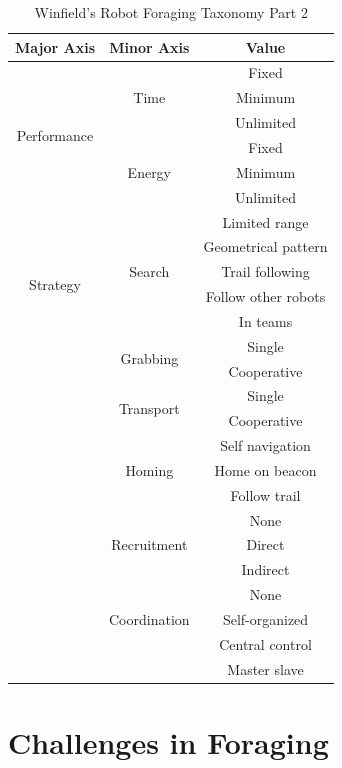 \begin{table}
\centering
    \caption{Winfield's Robot Foraging Taxonomy Part 2}
    \label{foragingtaxonomytable_part2}
    
\begin{tabular}{ | c | c | c |}
\hline
	Major Axis & Minor Axis & Value  \\ \hline
	\multirow{6}{*}{Performance}
		& \multirow{3}{*}{Time} 
			& Fixed \\  
		& 	& Minimum \\ 
		& 	& Unlimited \\ \cline{2-3}
		& \multirow{3}{*}{Energy} 
			& Fixed \\ 
		& 	& Minimum \\ 
		&	& Unlimited \\ \hline
	\multirow{6}{*}{Strategy}	
		& \multirow{5}{*}{Search} 
			& Limited range \\
		&	& Geometrical pattern\\
		&	& Trail following\\
		&	& Follow other robots\\
		&	& In teams\\ \cline{2-3}
		& \multirow{2}{*}{Grabbing} 
			& Single \\
		&	& Cooperative \\ \cline{2-3}
		& \multirow{2}{*}{Transport} 
			& Single \\
		&	& Cooperative \\ \cline{2-3}
		& \multirow{3}{*}{Homing} 
			& Self navigation \\
		&	& Home on beacon \\
		&	& Follow trail \\\cline{2-3}
		& \multirow{3}{*}{Recruitment} 
			& None \\
		&	& Direct \\
		&	& Indirect \\\cline{2-3}
		& \multirow{3}{*}{Coordination} 
			& None \\
		&	& Self-organized \\
		&	&  Central control \\
		&	& Master slave \\\hline
\end{tabular}
\end{table}


\section{Challenges in Foraging}
\label{challengesinforaging}

